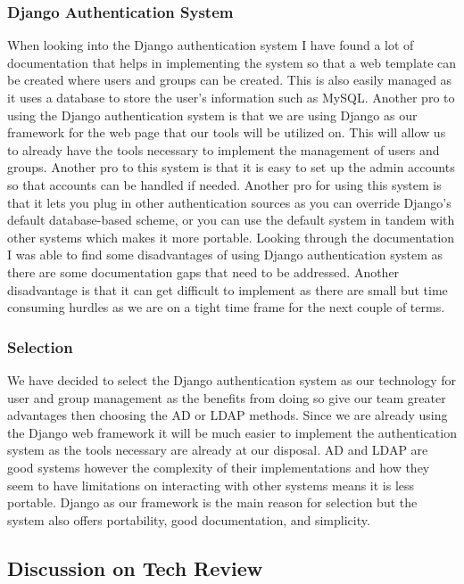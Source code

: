 \documentclass[draftclsnofoot,10pt,onecolumn]{IEEEtran} %
\begin{document}
\subsubsection{Django Authentication System}
When looking into the Django authentication system I have found a lot of documentation that helps in implementing the
system so that a web template can be created where users and groups can be created. This is also easily managed as it uses a
database to store the user’s information such as MySQL. Another pro to using the Django authentication system is that we
are using Django as our framework for the web page that our tools will be utilized on. This will allow us to already have the
tools necessary to implement the management of users and groups. Another pro to this system is that it is easy to set up the
admin accounts so that accounts can be handled if needed. Another pro for using this system is that it lets you plug in other
authentication sources as you can override Django’s default database-based scheme, or you can use the default system in
tandem with other systems which makes it more portable. Looking through the documentation I was able to find some
disadvantages of using Django authentication system as there are some documentation gaps that need to be addressed.
Another disadvantage is that it can get difficult to implement as there are small but time consuming hurdles as we are on a
tight time frame for the next couple of terms. \\

\subsubsection{Selection}
We have decided to select the Django authentication system as our technology for user and group management as the benefits
from doing so give our team greater advantages then choosing the AD or LDAP methods. Since we are already using the
Django web framework it will be much easier to implement the authentication system as the tools necessary are already at
our disposal. AD and LDAP are good systems however the complexity of their implementations and how they seem to have
limitations on interacting with other systems means it is less portable. Django as our framework is the main reason for
selection but the system also offers portability, good documentation, and simplicity. \\

\subsection{Discussion on Tech Review}
\end{document}
